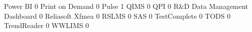 \documentclass{article}
\begin{document}
\begin{Schunk}
\begin{Soutput}
  Power BI                                                             0
  Print on Demand                                                      0
  Pulse                                                                1
  QIMS                                                                 0
  QPI                                                                  0
  R&D Data Management Dashboard                                        0
  Reliasoft Xfmea                                                      0
  RSLMS                                                                0
  SAS                                                                  0
  TestComplete                                                         0
  TODS                                                                 0
  TrendReader                                                          0
  WWLIMS                                                               0
                                                           

\end{Soutput}
\end{Schunk}
\end{document}
